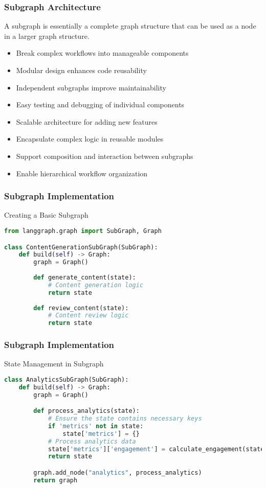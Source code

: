 \begin{frame}[fragile]\frametitle{Subgraph Architecture}
A subgraph is essentially a complete graph structure that can be used as a node in a larger graph structure. 

      \begin{itemize}
        \item Break complex workflows into manageable components
        \item Modular design enhances code reusability
        \item Independent subgraphs improve maintainability
        \item Easy testing and debugging of individual components
        \item Scalable architecture for adding new features
        \item Encapsulate complex logic in reusable modules
        \item Support composition and interaction between subgraphs
        \item Enable hierarchical workflow organization
      \end{itemize}
\end{frame}

\begin{frame}[fragile]\frametitle{Subgraph Implementation}

Creating a Basic Subgraph

\begin{lstlisting}[language=Python, basicstyle=\tiny]
from langgraph.graph import SubGraph, Graph

class ContentGenerationSubGraph(SubGraph):
    def build(self) -> Graph:
        graph = Graph()
        
        def generate_content(state):
            # Content generation logic
            return state
            
        def review_content(state):
            # Content review logic
            return state
\end{lstlisting}
\end{frame}

\begin{frame}[fragile]\frametitle{Subgraph Implementation}

State Management in Subgraph

\begin{lstlisting}[language=Python, basicstyle=\tiny]
class AnalyticsSubGraph(SubGraph):
    def build(self) -> Graph:
        graph = Graph()

        def process_analytics(state):
            # Ensure the state contains necessary keys
            if 'metrics' not in state:
                state['metrics'] = {}
            # Process analytics data
            state['metrics']['engagement'] = calculate_engagement(state)
            return state

        graph.add_node("analytics", process_analytics)
        return graph
\end{lstlisting}
\end{frame}



